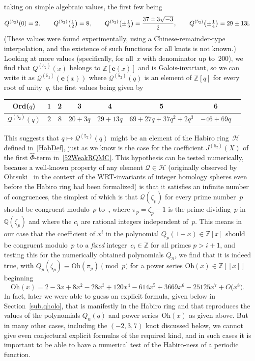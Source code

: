 \documentclass[pdftex]{sigma}
\numberwithin{equation}{section}
\def\calH{\mathcal H}
\def\z{\zeta}
\def\Phih{\widehat\Phi}
\def\e{\mathbf{e}}
\def\Z{\mathbb Z}
\def\Q{\mathbb Q}
\def\e{\mathbf{e}}
\def\z{\zeta}
\def\O{O}
\def\J{\mathbf J} \def\J{J} %
\def\sQ{\mathcal{Q}}
\begin{document}
taking on simple algebraic values, the first few being
\begin{gather*}
Q^{(5_2)}(0)=2,\qquad Q^{(5_2)}\big(\tfrac12\big)=8, \qquad
Q^{(5_2)}\bigl(\pm\tfrac13\bigr)=\frac{37\pm3\sqrt{-3}}2,
\qquad Q^{(5_2)}\bigl(\pm\tfrac14\bigr)=29\pm13{\rm i} .
\end{gather*}
(These values were found experimentally, using a Chinese-remainder-type interpolation,
and the existence of such functions for all knots is not known.)
Looking at more values (specifically, for all~$x$ with denominator up to~200),
we find that $Q^{(5_2)}(x)$ belongs to $\Z[\e(x)]$ and is Galois-invariant, so
we can write it as $\sQ^{(5_2)}(\e(x))$ where $\sQ^{(5_2)}(q)$ is an element
of $\Z[q]$ for every root of unity~$q$, the first values being given by
\begin{center}
\def\arraystretch{1.5}
\begin{tabular}{c|ccccccc}
Ord($q$) & $ 1 $ & 2 & 3 & 4 & 5 & 6\\ \hline
 $\sQ^{(5_2)}(q)$ & $ 2 $ & $ 8 $ & $ 20+3q $ & $ 29+13q $
 & $ 69+27q+37q^2+2q^3 $ & $ -46+69q $
\\
\end{tabular}
\end{center}
This suggests that $q\mapsto\sQ^{(5_2)}(q)$ might be an element of the Habiro
ring~$\calH$ defined in~\eqref{HabDef}, just as we know is the case for the
coefficient $\J^{(5_2)}(X)$ of the first
$\Phih$-term in~\eqref{52WeakRQMC}. This hypothesis can be tested numerically,
because a well-known property of any element $\sQ\in\calH$ (originally observed
by Ohtsuki~\cite{Oh} in the context of the WRT-invariants of integer homology
spheres even before the Habiro ring had been formalized) is that it satisfies
an infinite number of congruences, the simplest of which is that $\sQ(\z_p)$ for
every prime number~$p$ should be congruent modulo~$p$ to~, where $\pi_p=\z_p-1$ is the
prime dividing~$p$ in~$\Q(\z_p)$ and where the $c_i$ are rational integers
independent of~$p$. This means in our case that the coefficient of $x^i$ in
the polynomial $Q_p(1+x)\in\Z[x]$ should be congruent modulo~$p$ to a \emph{fixed}
integer~$c_i\in\Z$ for all primes $p>i+1$, and testing this for the numerically
obtained polynomials $Q_n$, we find that it is indeed true, with
$Q_p(\z_p)\equiv\text{Oh}(\pi_p)\!\pmod p$ for a power series
$\text{Oh}(x)\in\Z[[x]]$ beginning
\[%
\text{Oh}(x) = 2 - 3x + 8x^2 - 28x^3 + 120x^4 - 614x^5 + 3669x^6 - 25125x^7 + \O\big(x^8\big) .
\]
In fact, later we were able to guess an explicit formula, given below in
Section~\ref{sub.qholo}, that is manifestly in the Habiro ring and that reproduces
the values of the polynomials $Q_n(q)$ and power series~$\text{Oh}(x)$ as given
above. But in many other cases, including the $(-2,3,7)$ knot discussed
below, we cannot give even conjectural explicit formulas
of the required kind, and in such cases it is important to be able to have a numerical
test of the Habiro-ness of a periodic function.
\end{document}
